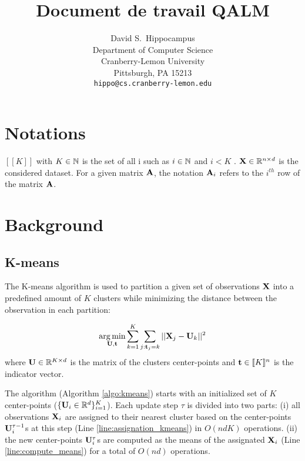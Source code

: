 \documentclass{article}
\title{Document de travail QALM}
\author{%
  David S.~Hippocampus \\
  Department of Computer Science\\
  Cranberry-Lemon University\\
  Pittsburgh, PA 15213 \\
  \texttt{hippo@cs.cranberry-lemon.edu} \\
}
\begin{document}
\maketitle

\section{Notations}

$[\![K]\!]$ with $K \in {\mathbb{N}}$ is the set of all i such as $i \in {\mathbb{N}}$ and $i < K$ . ${\mathbf{X}} \in \mathbb{R}^{n \times d}$ is the considered dataset. For a given matrix ${\mathbf{A}}$, the notation ${\mathbf{A}}_i$ refers to the $i^{th}$ row of the matrix ${\mathbf{A}}$.

\section{Background}

\subsection{K-means}

The K-means algorithm is used to partition a given set of observations ${\mathbf{X}}$ into a predefined amount of $K$ clusters while minimizing the distance between the observation in each partition:

\begin{equation}
\label{eq:kmean_problem}
    \operatorname*{arg\,min}_{{\mathbf{U}}, {\mathbf{t}}} \sum_{k=1}^{K} \sum_{j: {\mathbf{t}}_j = k} ||{\mathbf{X}}_j -{\mathbf{U}}_k||^2 \\
\end{equation}
where ${\mathbf{U}} \in \mathbb{R}^{K \times d}$ is the matrix of the clusters center-points and ${\mathbf{t}} \in  [\![K]\!]^n$ is the indicator vector.

The algorithm (Algorithm \ref{algo:kmeans}) starts with an initialized set of $K$ center-points ($\{{\mathbf{U}}_i \in \mathbb{R}^d\}_{i=1}^{K}$). Each update step $\tau$ is divided into two parts: (i) all observations ${\mathbf{X}}_i$ are assigned to their nearest cluster based on the center-points ${\mathbf{U}}_i^{\tau-1}$s at this step (Line \ref{line:assignation_kmeans}) in $O(ndK)$ operations. (ii) the new center-points ${\mathbf{U}}_i^{\tau}$s are computed as the means of the assignated ${\mathbf{X}}_i$ (Line \ref{line:compute_means}) for a total of $O(nd)$ operations.
\end{document}
